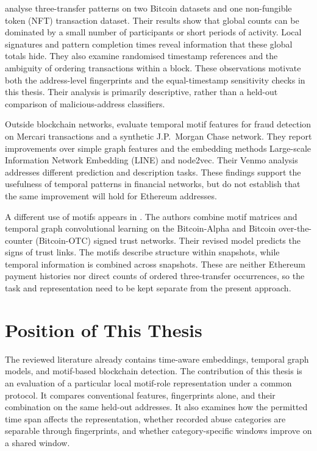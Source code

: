 \documentclass{thesisclass}
\begin{document}
\citet{arnold2024motifs} analyse three-transfer patterns on two Bitcoin
datasets and one non-fungible token (NFT) transaction dataset. Their results
show that global counts can be dominated by a small number of participants or
short periods of activity. Local signatures and pattern completion times
reveal information that these global totals hide. They also examine randomised
timestamp references and the ambiguity of ordering transactions within a block.
These observations motivate both the address-level fingerprints and the
equal-timestamp sensitivity checks in this thesis. Their analysis is primarily
descriptive, rather than a held-out comparison of malicious-address classifiers.

Outside blockchain networks, \citet{liu2023temporal} evaluate temporal motif
features for fraud detection on Mercari transactions and a synthetic
J.P.\ Morgan Chase network. They report improvements over simple graph
features and the embedding methods Large-scale Information Network Embedding
(LINE) and node2vec. Their Venmo analysis addresses different prediction and
description tasks. These findings support the usefulness of temporal patterns
in financial networks, but do not establish that the same improvement will
hold for Ethereum addresses.

A different use of motifs appears in \citet{mo2022motifgcn}.
The authors combine motif matrices and temporal graph convolutional learning
on the Bitcoin-Alpha and Bitcoin over-the-counter (Bitcoin-OTC) signed trust
networks. Their revised model predicts the signs of trust links. The motifs
describe structure within snapshots, while temporal information is combined
across snapshots. These are neither Ethereum payment histories nor direct
counts of ordered three-transfer occurrences, so the task and representation
need to be kept separate from the present approach.

\section{Position of This Thesis}
\label{sec:related_position}

The reviewed literature already contains time-aware embeddings, temporal graph
models, and motif-based blockchain detection. The contribution of this thesis
is an evaluation of a particular local motif-role representation under a common
protocol. It compares conventional features, fingerprints alone, and their
combination on the same held-out addresses. It also examines how the permitted
time span affects the representation, whether recorded abuse categories are
separable through fingerprints, and whether category-specific windows improve
on a shared window.
\end{document}
